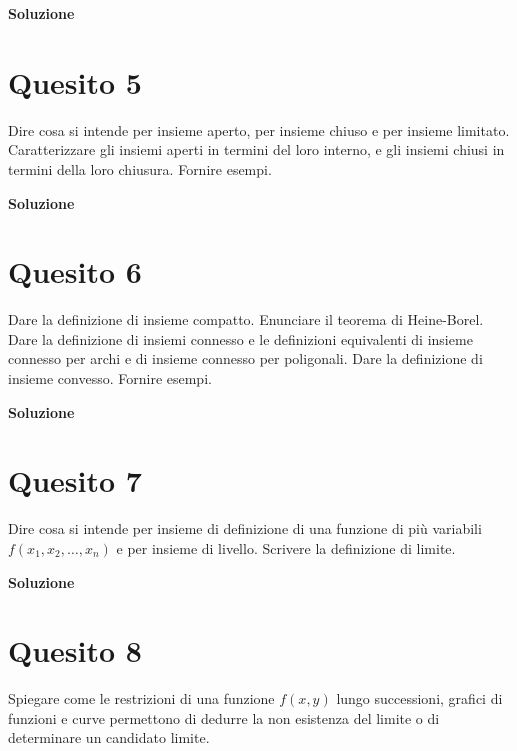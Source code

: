 \medskip
\begin{large}
\textbf{Soluzione}
\end{large}


\section*{Quesito 5}
Dire cosa si intende per insieme aperto, per insieme chiuso e per insieme
limitato. Caratterizzare gli insiemi aperti in termini del loro interno, e gli insiemi chiusi
in termini della loro chiusura. Fornire esempi.


\medskip
\begin{large}
\textbf{Soluzione}
\end{large}


\section*{Quesito 6}
Dare la definizione di insieme compatto. Enunciare il teorema di Heine-Borel.
Dare la definizione di insiemi connesso e le definizioni equivalenti di insieme connesso per
archi e di insieme connesso per poligonali. Dare la definizione di insieme convesso. Fornire
esempi.

\medskip
\begin{large}
\textbf{Soluzione}
\end{large}


\section*{Quesito 7}
Dire cosa si intende per insieme di definizione di una funzione di più variabili
$f(x_1, x_2, \dots , x_n)$ e per insieme di livello. Scrivere la definizione di limite.

\medskip
\begin{large}
\textbf{Soluzione}
\end{large}


\section*{Quesito 8}
Spiegare come le restrizioni di una funzione $f(x, y)$ lungo successioni, grafici
di funzioni e curve permettono di dedurre la non esistenza del limite o di determinare un
candidato limite.

